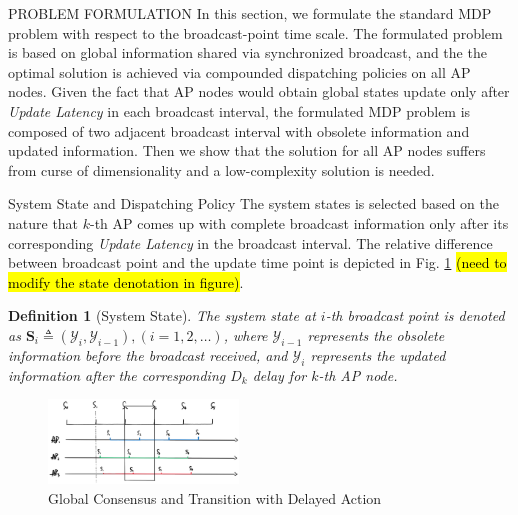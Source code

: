 \documentclass[10pt, conference, letterpaper]{IEEEtran}
\newtheorem{definition}{Definition}
\newcommand{\define}{\triangleq}
\newcommand{\Stat}{\mathbf{S}}
\newcommand{\Obsv}{\mathcal{Y}}
\begin{document}
    \begin{section}{PROBLEM FORMULATION}
        \label{sec:formulation}
        In this section, we formulate the standard MDP problem with respect to the broadcast-point time scale. The formulated problem is based on global information shared via synchronized broadcast, and the the optimal solution is achieved via compounded dispatching policies on all AP nodes.
        Given the fact that AP nodes would obtain global states update only after \emph{Update Latency} in each broadcast interval, the formulated MDP problem is composed of two adjacent broadcast interval with obsolete information and updated information.
        Then we show that the solution for all AP nodes suffers from curse of dimensionality and a low-complexity solution is needed.

        \begin{subsection}{System State and Dispatching Policy}
            The system states is selected based on the nature that $k$-th AP comes up with complete broadcast information only after its corresponding \emph{Update Latency} in the broadcast interval.
            The relative difference between broadcast point and the update time point is depicted in Fig. \ref{fig:br-trans} \hl{(need to modify the state denotation in figure)}.
            \begin{definition}[System State]
                The system state at $i$-th broadcast point is denoted as $\Stat_i \define (\Obsv_{i}, \Obsv_{i-1}), (i=1,2,\dots)$, where $\Obsv_{i-1}$ represents the obsolete information before the broadcast received, and $\Obsv_{i}$ represents the updated information after the corresponding $D_k$ delay for $k$-th AP node.
            \end{definition}

            \begin{figure}[ht]
                \centering
                \includegraphics[width=0.45\textwidth]{broadcast-trans.png}
                \caption{Global Consensus and Transition with Delayed Action}
                \label{fig:br-trans}
            \end{figure}


\end{subsection}
\end{section}
\end{document}
